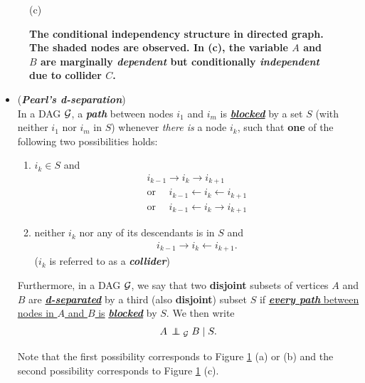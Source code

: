 \documentclass[11pt]{article}
\begin{document}
\begin{figure}
\begin{minipage}[t]{0.5\linewidth}
  \vspace{-5pt}
  \centerline{(c)}
\end{minipage}
\caption{\footnotesize{\textbf{The conditional independency structure in directed graph. The shaded nodes are observed. In (c), the variable $A$ and $B$ are marginally \emph{dependent} but conditionally \emph{independent} due to collider $C$. }}}
\label{fig: cond_indep}
\end{figure}

\begin{itemize}
\item 
\begin{definition} (\emph{\textbf{Pearl's d-separation}}) \citep{koller2009probabilistic, pearl2000causal, peters2017elements}\\
In a DAG ${\mathcal G}$, a \emph{\textbf{path}} between nodes $i_1$ and $i_m$ is \underline{\textbf{\emph{blocked}}} by a set $S$ (with neither $i_1$ nor $i_m$ in $S$) whenever \emph{there is} a node $i_k$, such that \textbf{one} of the following two possibilities holds:
\begin{enumerate}
\item $i_k \in S$ and 
\begin{align*}
i_{k−1} \rightarrow i_k \rightarrow  i_{k+1} \\
\text{or }\quad i_{k−1} \leftarrow i_k \leftarrow  i_{k+1} \\
\text{or }\quad i_{k−1} \leftarrow i_k \rightarrow i_{k+1}
\end{align*}

\item neither $i_k$ nor any of its descendants is in $S$ and
\begin{align*}
i_{k−1} \rightarrow i_k  \leftarrow i_{k+1}.
\end{align*} ($i_k$ is referred to as a \emph{\textbf{collider}})
\end{enumerate}
Furthermore, in a DAG ${\mathcal G}$, we say that two \textbf{disjoint} subsets of vertices $A$ and $B$ are \underline{\emph{\textbf{d-separated}}} by a third (also \textbf{disjoint}) subset $S$ if \underline{\emph{\textbf{every path}} between nodes in $A$ and $B$ is} \underline{\emph{\textbf{blocked}}} by $S$. We then write
\begin{align*}
A \,\indep_{\cG} \; B \;|\; S.
\end{align*}
\end{definition} 
Note that the first possibility corresponds to Figure \ref{fig: cond_indep} (a) or (b) and the second possibility corresponds to Figure \ref{fig: cond_indep} (c).  


\end{itemize}
\end{document}

